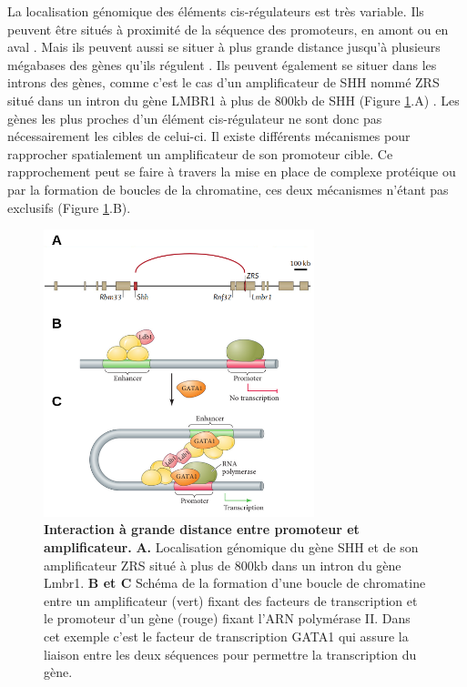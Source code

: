 La localisation génomique des éléments \gls{cis}-régulateurs est très variable. Ils peuvent être situés à proximité de la séquence des promoteurs, en amont ou en aval \citep{maniatis_regulation_1987}. Mais ils peuvent aussi se situer à plus grande distance jusqu’à plusieurs mégabases des gènes qu’ils régulent \citep{visel_chip-seq_2009}. Ils peuvent également se situer dans les introns des gènes, comme c’est le cas d’un \gls{amplificateur} de \acrshort{SHH} nommé \acrshort{ZRS} situé dans un intron du gène LMBR1 à plus de 800kb de \acrshort{SHH} (Figure \ref{fig:Fig6}.A) \citep{lettice_long-range_2003}. Les gènes les plus proches d’un élément \gls{cis}-régulateur ne sont donc pas nécessairement les cibles de celui-ci. Il existe différents mécanismes pour rapprocher spatialement un \gls{amplificateur} de son promoteur cible. Ce rapprochement peut se faire à travers la mise en place de complexe protéique ou par la formation de boucles de la chromatine, ces deux mécanismes n’étant pas exclusifs (Figure \ref{fig:Fig6}.B).\\

\begin{figure}[h]
    \centering
    \includegraphics[width=0.7\textwidth, page=1] {figures/introduction/fig6.png}
    \caption[Interaction à grande distance entre promoteur et \gls{amplificateur}.]{
    \textbf{Interaction à grande distance entre promoteur et \gls{amplificateur}.}
    \textbf{A.} Localisation génomique du gène \acrshort{SHH} et de son \gls{amplificateur} \acrshort{ZRS} situé à plus de 800kb dans un intron du gène Lmbr1.
    \textbf{B et C} Schéma de la formation d'une boucle de chromatine entre un \gls{amplificateur} (vert)  fixant des facteurs de transcription et le promoteur d'un gène (rouge) fixant l'\acrshort{ARN} polymérase II. Dans cet exemple c'est le facteur de transcription GATA1 qui assure la liaison entre les deux séquences pour permettre la transcription du gène.\\
    }
    \label{fig:Fig6}
\end{figure}

